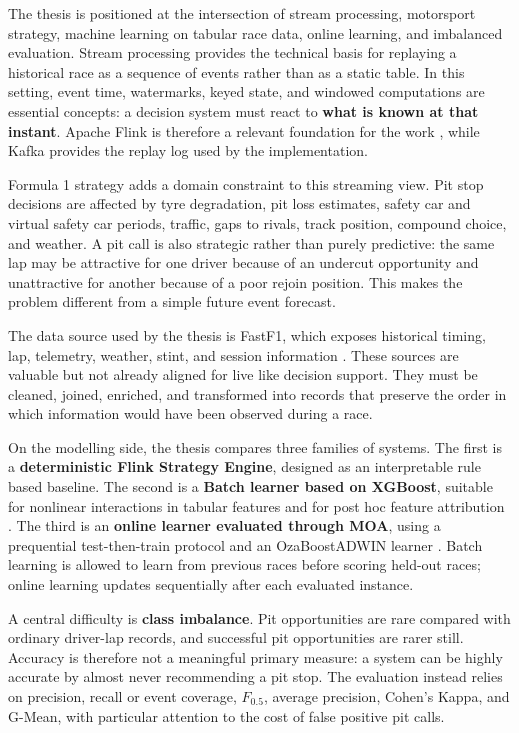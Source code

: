 The thesis is positioned at the intersection of stream processing, motorsport strategy, machine learning on tabular race data, 
online learning, and imbalanced evaluation. Stream processing provides the technical basis for replaying a historical race as a sequence 
of events rather than as a static table. In this setting, event time, watermarks, keyed state, and windowed computations are essential concepts: 
a decision system must react to \textbf{what is known at that instant}. Apache Flink is therefore a relevant foundation 
for the work \citep{carbone2015flink}, while Kafka provides the replay log used by the implementation.

Formula 1 strategy adds a domain constraint to this streaming view. Pit stop decisions are affected by tyre degradation, pit loss estimates, 
safety car and virtual safety car periods, traffic, gaps to rivals, track position, compound choice, and weather. A pit call is also strategic 
rather than purely predictive: the same lap may be attractive for one driver because of an undercut opportunity and unattractive for another 
because of a poor rejoin position. This makes the problem different from a simple future event forecast.

The data source used by the thesis is FastF1, which exposes historical timing, lap, telemetry, weather, stint, and session information 
\citep{Oehrly2025}. These sources are valuable but not already aligned for live like decision support. They must be cleaned, joined, enriched, 
and transformed into records that preserve the order in which information would have been observed during a race.

On the modelling side, the thesis compares three families of systems. The first is a \textbf{deterministic Flink Strategy Engine}, designed as 
an interpretable rule based baseline. The second is a \textbf{Batch learner based on XGBoost}, suitable for nonlinear interactions in tabular 
features and for post hoc feature attribution \citep{chen2016xgboost}. The third is an \textbf{online learner evaluated through MOA}, using a 
prequential test-then-train protocol and an OzaBoostADWIN learner \citep{bifet2010moa}. Batch learning is allowed to learn from previous races 
before scoring held-out races; online learning updates sequentially after each evaluated instance.

A central difficulty is \textbf{class imbalance}. Pit opportunities are rare compared with ordinary driver-lap records, and successful pit 
opportunities are rarer still. Accuracy is therefore not a meaningful primary measure: a system can be highly accurate by almost never 
recommending a pit stop. The evaluation instead relies on precision, recall or event coverage, $F_{0.5}$, average precision, Cohen's Kappa, 
and G-Mean, with particular attention to the cost of false positive pit calls.
